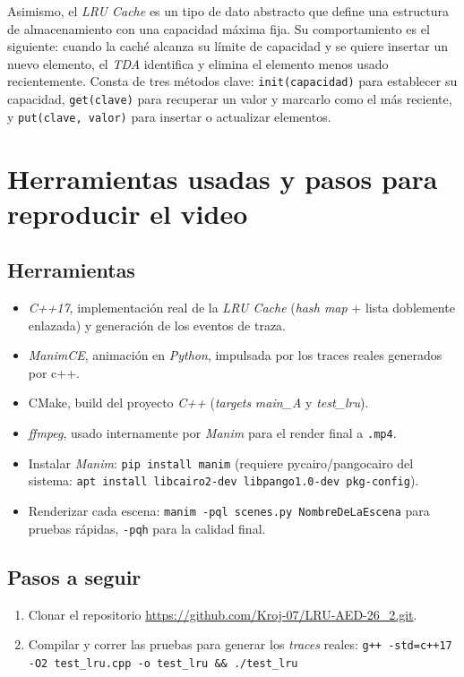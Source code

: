 \documentclass[a4paper, table]{article}
\begin{document}
Asimismo, el \textit{LRU Cache} es un tipo de dato abstracto que define una estructura de almacenamiento con una capacidad máxima fija. Su comportamiento es el siguiente: cuando la caché alcanza su límite de capacidad y se quiere insertar un nuevo elemento, el \textit{TDA} identifica y elimina el elemento menos usado recientemente. Consta de tres métodos clave: \texttt{init(capacidad)} para establecer su capacidad, \texttt{get(clave)} para recuperar un valor y marcarlo como el más reciente, y \texttt{put(clave, valor)} para insertar o actualizar elementos. 

\section{Herramientas usadas y pasos para reproducir el video}

\subsection{Herramientas}

\begin{itemize}
    \item \textit{C++17}, implementación real de la \textit{LRU Cache} (\textit{hash map} + lista doblemente enlazada) y generación de los eventos de traza.
    \item \textit{ManimCE}, animación en \textit{Python}, impulsada por los traces reales generados por c++.
    \item CMake, build del proyecto \textit{C++} (\textit{targets} \textit{main\_A} y \textit{test\_lru}).
    \item \textit{ffmpeg}, usado internamente por \textit{Manim} para el render final a \texttt{.mp4}.
    \item Instalar \textit{Manim}: \texttt{pip install manim} (requiere pycairo/pangocairo del sistema: \texttt{apt install libcairo2-dev libpango1.0-dev pkg-config}).
    \item Renderizar cada escena: \texttt{manim -pql scenes.py NombreDeLaEscena} para pruebas rápidas, \texttt{-pqh} para la calidad final. 

\end{itemize}

\subsection{Pasos a seguir}

\begin{enumerate}
    \item Clonar el repositorio \url{https://github.com/Kroj-07/LRU-AED-26_2.git}.
    \item Compilar y correr las pruebas para generar los \textit{traces} reales: \texttt{g++ -std=c++17 -O2 test\_lru.cpp -o test\_lru \&\& ./test\_lru}
\end{enumerate}
\end{document}
